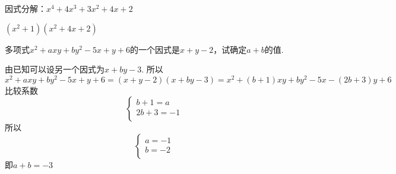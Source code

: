 \documentclass[windows,csize4]{BHCexam}
\begin{document}
\begin{groups}
\begin{questions}[]
        \question[5] 因式分解：$x^4+4x^3+3x^2+4x+2$
        \begin{solution}{0.5cm}
            \methodonly $(x^2+1)(x^2+4x+2)$
        \end{solution}
        \vspace{3.5cm}

        \question[5] 多项式$x^2+axy+by^2-5x+y+6$的一个因式是$x+y-2$，试确定$a+b$的值.
        \begin{solution}{0.5cm}
            \methodonly 由已知可以设另一个因式为$x+by-3$. 所以
            \[
                x^2+axy+by^2-5x+y+6=(x+y-2)(x+by-3)=x^2+(b+1)xy+by^2-5x-(2b+3)y+6
            \]
            比较系数
            \[
                \begin{cases}
                    b+1=a    \\
                    2b+3=-1 \\
                \end{cases}
            \]
            所以
            \[
                \begin{cases}
                    a=-1    \\
                    b=-2 \\
                \end{cases}
            \]
            即$a+b=-3$
            \end{solution}
               

    \end{questions}

\end{groups}


\label{lastpage}
\end{document}
